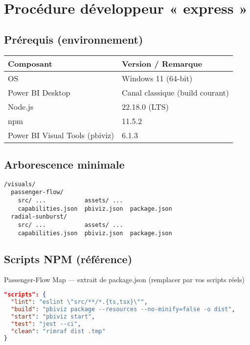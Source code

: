 \section{Procédure développeur « express »}
\label{ann:a5-dev}

\subsection{Prérequis (environnement)}
\begin{tabularx}{\linewidth}{l X}
\toprule
\textbf{Composant} & \textbf{Version / Remarque} \\
\midrule
OS & Windows 11 (64-bit) \\
Power BI Desktop & Canal classique (build courant) \\
Node.js & 22.18.0 (LTS) \\
npm & 11.5.2 \\
Power BI Visual Tools (pbiviz) & 6.1.3 \\
\bottomrule
\end{tabularx}

\subsection{Arborescence minimale}
\begin{lstlisting}[basicstyle=\ttfamily\small]
/visuals/
  passenger-flow/
    src/ ...           assets/ ...
    capabilities.json  pbiviz.json  package.json
  radial-sunburst/
    src/ ...           assets/ ...
    capabilities.json  pbiviz.json  package.json
\end{lstlisting}

\subsection{Scripts NPM (référence)}
Passenger-Flow Map — extrait de package.json (remplacer par vos scripts réels)
\begin{lstlisting}[language=json,basicstyle=\ttfamily\small,breaklines=true,columns=fullflexible]
"scripts": {
  "lint": "eslint \"src/**/*.{ts,tsx}\"",
  "build": "pbiviz package --resources --no-minify=false -o dist",
  "start": "pbiviz start",
  "test": "jest --ci",
  "clean": "rimraf dist .tmp"
}
\end{lstlisting}

